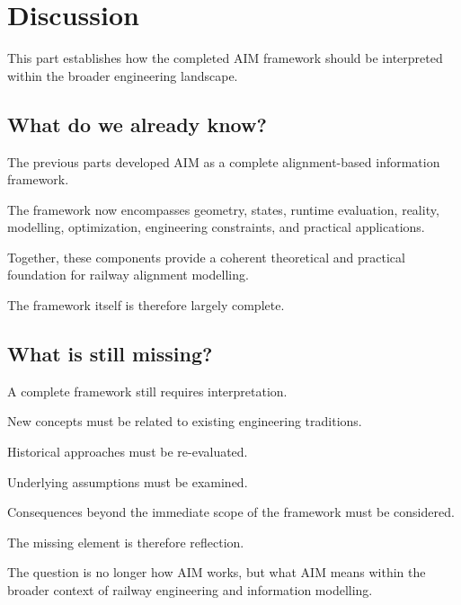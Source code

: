 
\chapter*{Discussion}
{}

This part establishes how the completed AIM framework should be
interpreted within the broader engineering landscape.

\section*{What do we already know?}

The previous parts developed AIM as a complete alignment-based
information framework.

The framework now encompasses geometry, states, runtime evaluation,
reality, modelling, optimization, engineering constraints, and
practical applications.

Together, these components provide a coherent theoretical and practical
foundation for railway alignment modelling.

The framework itself is therefore largely complete.

\section*{What is still missing?}

A complete framework still requires interpretation.

New concepts must be related to existing engineering traditions.

Historical approaches must be re-evaluated.

Underlying assumptions must be examined.

Consequences beyond the immediate scope of the framework must be
considered.

The missing element is therefore reflection.

The question is no longer how AIM works, but what AIM means within the
broader context of railway engineering and information modelling.

